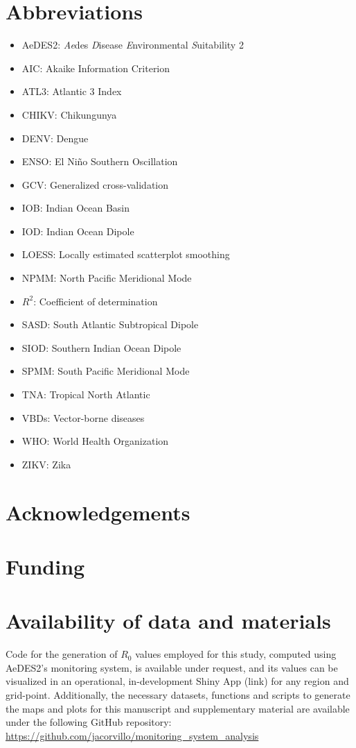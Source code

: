 \documentclass[10pt,twocolumn]{wlscirep}
\begin{document}
\section{Abbreviations} \label{sec-abbreviations}
\begin{itemize}
  \item AeDES2: \textit{Ae}des \textit{D}isease \textit{E}nvironmental \textit{S}uitability 2
  \item AIC: Akaike Information Criterion
  \item ATL3: Atlantic 3 Index
  \item CHIKV: Chikungunya
  \item DENV: Dengue
  \item ENSO: El Niño Southern Oscillation
  \item GCV: Generalized cross-validation
  \item IOB: Indian Ocean Basin
  \item IOD: Indian Ocean Dipole
  \item LOESS: Locally estimated scatterplot smoothing
  \item NPMM: North Pacific Meridional Mode
  \item $R^2$: Coefficient of determination
  \item SASD: South Atlantic Subtropical Dipole
  \item SIOD: Southern Indian Ocean Dipole
  \item SPMM: South Pacific Meridional Mode
  \item TNA: Tropical North Atlantic
  \item VBDs: Vector-borne diseases
  \item WHO: World Health Organization
  \item ZIKV: Zika
\end{itemize}

\section{Acknowledgements} \label{sec-acknowledgements}

\section{Funding} \label{sec-funding}

\section{Availability of data and materials} \label{sec-availability}
Code for the generation of $R_0$ values employed for this study, computed using AeDES2's monitoring system, is available under request, and its values can be visualized in an operational, in-development Shiny App (link) for any region and grid-point. Additionally, the necessary datasets, functions and scripts to generate the maps and plots for this manuscript and supplementary material are available under the following GitHub repository: \url{https://github.com/jacorvillo/monitoring_system_analysis}
\end{document}
